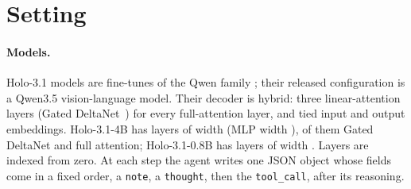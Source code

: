 \section{Setting}
\label{sec:setting}

\paragraph{Models.} Holo-3.1 models are fine-tunes of the Qwen family \citep{hcompany2026holo31}; their released configuration is a Qwen3.5 vision-language model. Their decoder is hybrid: three linear-attention layers (Gated DeltaNet~\citep{yang2025gateddeltanet}) for every full-attention layer, and tied input and output embeddings. Holo-3.1-4B has \cfgBigLayers{} layers of width \cfgBigHidden{} (MLP width \cfgBigInter), \cfgBigNLinear{} of them Gated DeltaNet and \cfgBigNFull{} full attention; Holo-3.1-0.8B has \cfgSmallLayers{} layers of width \cfgSmallHidden. Layers are indexed from zero. At each step the agent writes one JSON object whose fields come in a fixed order, a \texttt{note}, a \texttt{thought}, then the \texttt{tool\_call}, after its reasoning. %

